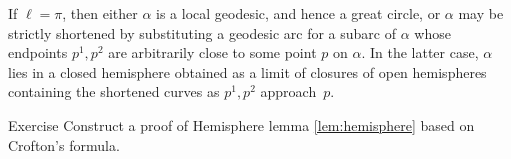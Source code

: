 If $\ell=\pi$, then either $\alpha$ is a local geodesic, and hence a great circle, 
or $\alpha$ may be strictly shortened by substituting a geodesic arc for a subarc of $\alpha$ 
whose endpoints $p^1,p^2$ are arbitrarily close to some point $p$ on  $\alpha$.
In the latter case,  $\alpha$ lies in a closed hemisphere obtained as a limit of closures of open hemispheres  containing the shortened curves as $p^1,p^2$ approach~$p$.
\qeds




\begin{thm}{Exercise}\label{exr-crofton}
Construct a proof of Hemisphere lemma
\ref{lem:hemisphere} based on Crofton's formula.
\end{thm}







